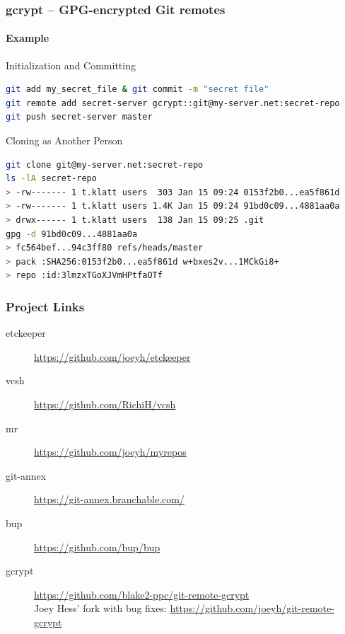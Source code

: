 \documentclass[english,hyperref={pdfpagelabels=false},aspectratio=1610]{beamer}
\begin{document}
\begin{frame}[fragile]
  \frametitle{gcrypt -- GPG-encrypted Git remotes}
  \framesubtitle{Example}
  \begin{block}{Initialization and Committing}
    \vspace{-0.75em}
    \begin{lstlisting}[language=zsh]
git add my_secret_file & git commit -m "secret file"
git remote add secret-server gcrypt::git@my-server.net:secret-repo
git push secret-server master
    \end{lstlisting}
    \vspace{-0.75em}
  \end{block}
  \begin{block}{Cloning as Another Person}
    \vspace{-0.75em}
    \begin{lstlisting}[language=zsh]
git clone git@my-server.net:secret-repo
ls -lA secret-repo
> -rw------- 1 t.klatt users  303 Jan 15 09:24 0153f2b0...ea5f861d
> -rw------- 1 t.klatt users 1.4K Jan 15 09:24 91bd0c09...4881aa0a
> drwx------ 1 t.klatt users  138 Jan 15 09:25 .git
gpg -d 91bd0c09...4881aa0a
> fc564bef...94c3ff80 refs/heads/master
> pack :SHA256:0153f2b0...ea5f861d w+bxes2v...1MCkGi8+
> repo :id:3lmzxTGoXJVmHPtfaOTf
    \end{lstlisting}
    \vspace{-0.75em}
  \end{block}
\end{frame}



\begin{frame}
  \frametitle{Project Links}
  \begin{description}
    \item[etckeeper] \url{https://github.com/joeyh/etckeeper}
    \item[vcsh] \url{https://github.com/RichiH/vcsh}
    \item[mr] \url{https://github.com/joeyh/myrepos}
    \item[git-annex] \url{https://git-annex.branchable.com/}
    \item[bup] \url{https://github.com/bup/bup}
    \item[gcrypt] \url{https://github.com/blake2-ppc/git-remote-gcrypt}\\
      {\tiny Joey Hess' fork with bug fixes: \url{https://github.com/joeyh/git-remote-gcrypt}}
  \end{description}
\end{frame}
\end{document}
